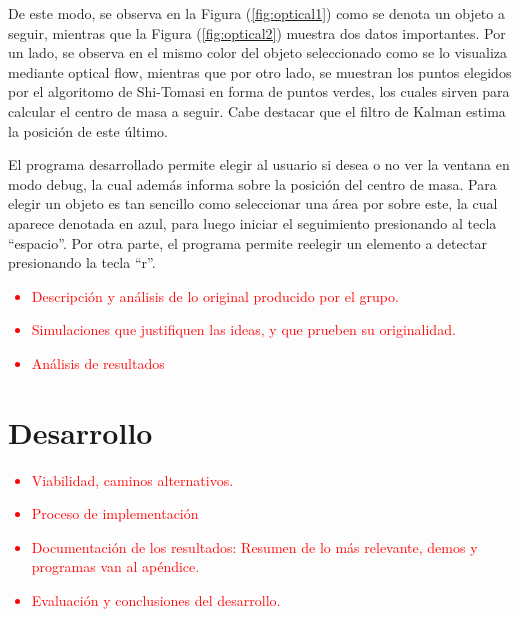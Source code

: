 De este modo, se observa en la Figura (\ref{fig:optical1}) como se denota un objeto a seguir, mientras que la Figura (\ref{fig:optical2}) muestra dos datos importantes. Por un lado, se observa en el mismo color del objeto seleccionado como se lo visualiza mediante optical flow, mientras que por otro lado, se muestran los puntos elegidos por el algoritomo de Shi-Tomasi en forma de puntos verdes, los cuales sirven para calcular el centro de masa a seguir. Cabe destacar que el filtro de Kalman estima la posición de este último.

El programa desarrollado permite elegir al usuario si desea o no ver la ventana en modo debug, la cual además informa sobre la posición del centro de masa. Para elegir un objeto es tan sencillo como seleccionar una área por sobre este, la cual aparece denotada en azul, para luego iniciar el seguimiento presionando al tecla ``espacio''. Por otra parte, el programa permite reelegir un elemento a detectar presionando la tecla ``r''.


\textcolor{red}{
\begin{itemize}
	\item Descripción y análisis de lo original producido por el grupo.
	\item Simulaciones que justifiquen las ideas, y que prueben su originalidad.
	\item Análisis de resultados
\end{itemize}
}

\section{Desarrollo}
\textcolor{red}{
\begin{itemize}
	\item Viabilidad, caminos alternativos.
	\item Proceso de implementación
	\item Documentación de los resultados: Resumen de lo más relevante, demos y programas van al apéndice.
	\item Evaluación y conclusiones del desarrollo.
\end{itemize}
}


